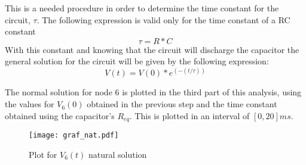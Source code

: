 \vspace{20pt}
This is a needed procedure in order to determine the time constant for the circuit, $\tau$. The following expression is valid only for the time constant of a RC constant
\begin{equation}
\tau=R*C
\end{equation}
 With this constant and knowing that the circuit will discharge the capacitor the general solution for the circuit will be given by the following expression:
\begin{equation}
V(t)=V(0)*e^(-(t/\tau))
\end{equation}


The normal solution for node 6 is plotted in the third part of this analysis, using the values for $V_6(0)$ obtained in the previous step and the time constant obtained using the capacitor's $R_{eq}$. This is plotted in an interval of $[0, 20]ms$.
\begin{figure}[h] \centering
\texttt{[image: graf\_nat.pdf]}
\caption{Plot for $V_6(t)$ natural solution}
\end{figure}

